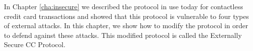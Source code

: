 In Chapter \ref{cha:insecure} we described the protocol in use today for contactless credit card transactions
    and showed that this protocol is vulnerable to four types of external attacks.
In this chapter, we show how to modify the protocol in order to defend against these attacks.
This modified protocol is called the Externally Secure CC Protocol.
